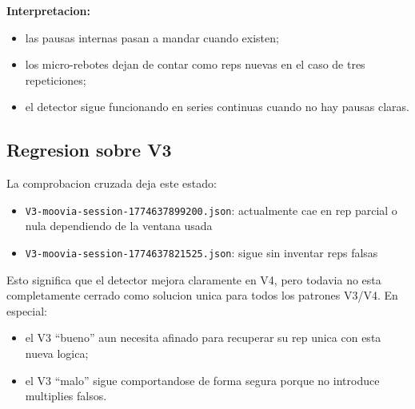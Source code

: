 ﻿\documentclass[11pt,a4paper]{article}
\begin{document}
\begin{table}[h!]
\centering
\small
{}
\caption{Estado del detector tras introducir segmentacion hibrida.}
\end{table}

\textbf{Interpretacion:}
\begin{itemize}[leftmargin=14pt]
  \item las pausas internas pasan a mandar cuando existen;
  \item los micro-rebotes dejan de contar como reps nuevas en el caso de tres repeticiones;
  \item el detector sigue funcionando en series continuas cuando no hay pausas claras.
\end{itemize}

\subsection*{Regresion sobre V3}
La comprobacion cruzada deja este estado:
\begin{itemize}[leftmargin=14pt]
  \item \texttt{V3-moovia-session-1774637899200.json}: actualmente cae en rep parcial o nula dependiendo de la ventana usada
  \item \texttt{V3-moovia-session-1774637821525.json}: sigue sin inventar reps falsas
\end{itemize}

Esto significa que el detector mejora claramente en V4, pero todavia no esta completamente cerrado como solucion unica para todos los patrones V3/V4. En especial:
\begin{itemize}[leftmargin=14pt]
  \item el V3 ``bueno'' aun necesita afinado para recuperar su rep unica con esta nueva logica;
  \item el V3 ``malo'' sigue comportandose de forma segura porque no introduce multiplies falsos.
\end{itemize}
\end{document}
